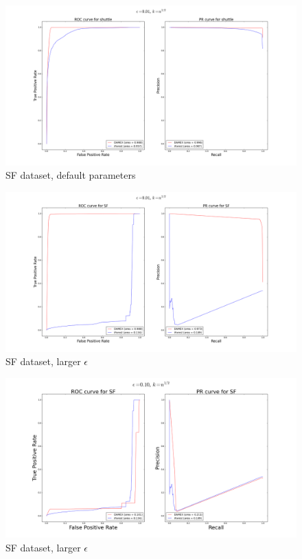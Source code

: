 \begin{figure}[!ht]
  \centering
  \includegraphics[width = \textwidth]{fig_source/shuttle-semi-supervised-average-rect-01.png}
  \caption{SF dataset, default parameters}
\label{jmva:fig:shuttle}
\end{figure}
\begin{figure}[!ht]
  \centering
  \includegraphics[width = \textwidth]{fig_source/SF-4d-lb-semi-supervised-average-rect-01}
  \caption{SF dataset, larger $\epsilon$}
\label{jmva:fig:SF}
\end{figure}
\begin{figure}[!ht]
  \centering
  \includegraphics[width = \textwidth]{fig_source/SF-4d-lb-semi-supervised-average-rect-1}
  \caption{SF dataset, larger $\epsilon$}
\label{jmva:fig:SF_1}
\end{figure}

